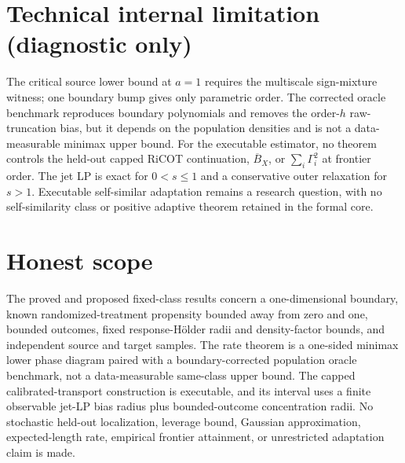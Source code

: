 \documentclass{article}
\begin{document}
\section*{Technical internal limitation (diagnostic only)}

The critical source lower bound at \(a=1\) requires the multiscale sign-mixture witness; one boundary bump gives only parametric order. The corrected oracle benchmark reproduces boundary polynomials and removes the order-\(h\) raw-truncation bias, but it depends on the population densities and is not a data-measurable minimax upper bound. For the executable estimator, no theorem controls the held-out capped RiCOT continuation, \(\overline B_X\), or \(\sum_i\Gamma_i^2\) at frontier order. The jet LP is exact for \(0<s\le1\) and a conservative outer relaxation for \(s>1\). Executable self-similar adaptation remains a research question, with no self-similarity class or positive adaptive theorem retained in the formal core.

\section{Honest scope}

The proved and proposed fixed-class results concern a one-dimensional boundary, known randomized-treatment propensity bounded away from zero and one, bounded outcomes, fixed response-Hölder radii and density-factor bounds, and independent source and target samples. The rate theorem is a one-sided minimax lower phase diagram paired with a boundary-corrected population oracle benchmark, not a data-measurable same-class upper bound. The capped calibrated-transport construction is executable, and its interval uses a finite observable jet-LP bias radius plus bounded-outcome concentration radii. No stochastic held-out localization, leverage bound, Gaussian approximation, expected-length rate, empirical frontier attainment, or unrestricted adaptation claim is made.
\end{document}
